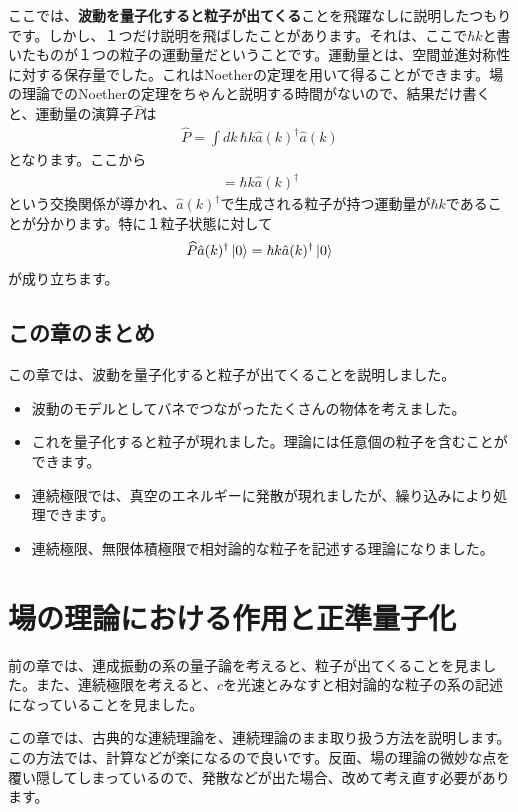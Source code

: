 \documentclass[report,paper=a4, fontsize=12pt, line_length=16cm, number_of_lines=33,dvipdfmx]{jlreq}
\numberwithin{equation}{chapter}
\newcommand{\strong}[1]{{\sffamily \bfseries #1}}
\newcommand{\ah}{\hat{a}}
\newcommand{\Ph}{\widehat{P}}
\begin{document}
ここでは、\strong{波動を量子化すると粒子が出てくる}ことを飛躍なしに説明したつもりです。しかし、１つだけ説明を飛ばしたことがあります。それは、ここで$\hbar k$と書いたものが１つの粒子の運動量だということです。運動量とは、空間並進対称性に対する保存量でした。これはNoetherの定理を用いて得ることができます。場の理論でのNoetherの定理をちゃんと説明する時間がないので、結果だけ書くと、運動量の演算子$\Ph$は
\begin{align}
  \Ph=\int dk \,\hbar k \ah(k)^{\dag}\ah(k)
\end{align}
となります。ここから
\begin{align}
  [\Ph,\ah(k)^{\dag}]=\hbar k\ah(k)^{\dag}
\end{align}
という交換関係が導かれ、$\ah(k)^{\dag}$で生成される粒子が持つ運動量が$\hbar k$であることが分かります。特に１粒子状態に対して
\begin{align}
  \Ph \ah(k)^{\dag}\ket{0}=\hbar k\ah(k)^{\dag}\ket{0}
\end{align}
が成り立ちます。

\section{この章のまとめ}
この章では、波動を量子化すると粒子が出てくることを説明しました。
\begin{itemize}
  \item 波動のモデルとしてバネでつながったたくさんの物体を考えました。
  \item これを量子化すると粒子が現れました。理論には任意個の粒子を含むことができます。
  \item 連続極限では、真空のエネルギーに発散が現れましたが、繰り込みにより処理できます。
  \item 連続極限、無限体積極限で相対論的な粒子を記述する理論になりました。
\end{itemize}

\chapter{場の理論における作用と正準量子化}
前の章では、連成振動の系の量子論を考えると、粒子が出てくることを見ました。また、連続極限を考えると、$c$を光速とみなすと相対論的な粒子の系の記述になっていることを見ました。

この章では、古典的な連続理論を、連続理論のまま取り扱う方法を説明します。この方法では、計算などが楽になるので良いです。反面、場の理論の微妙な点を覆い隠してしまっているので、発散などが出た場合、改めて考え直す必要があります。
\end{document}

